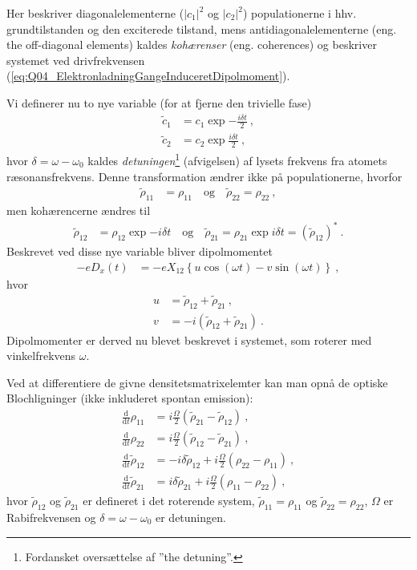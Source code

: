Her beskriver diagonalelementerne ($|c_1|^2$ og $|c_2|^2$) populationerne i hhv. grundtilstanden og den exciterede tilstand, mens antidiagonalelementerne (eng. the off-diagonal elements) kaldes \emph{kohærenser} (eng. coherences) og beskriver systemet ved drivfrekvensen (\cref{eq:Q04_ElektronladningGangeInduceretDipolmoment}).

Vi definerer nu to nye variable (for at fjerne den trivielle fase)
\begin{align}
    \widetilde{c}_1 &= c_1\exp{-\frac{i\delta t}{2}} \: , \\
    \widetilde{c}_2 &= c_2\exp{\frac{i\delta t}{2}} \: ,
\end{align}
hvor $\delta = \omega - \omega_0$ kaldes \emph{detuningen}\footnote{Fordansket oversættelse af ''the detuning''.} (afvigelsen) af lysets frekvens fra atomets ræsonansfrekvens. Denne transformation ændrer ikke på populationerne, hvorfor
\begin{align}
    \widetilde{\rho}_{11} &= \rho_{11} \quad \text{og} \quad \widetilde{\rho}_22 = \rho_{22} \: ,
\end{align}
men kohærencerne ændres til
\begin{align}
    \widetilde{\rho}_{12} &= \rho_{12}\exp{-i\delta t} \quad \text{og} \quad \widetilde{\rho}_{21} = \rho_{21}\exp{i\delta t} = (\widetilde{\rho}_{12})^* \: .
\end{align}
Beskrevet ved disse nye variable bliver dipolmomentet
\begin{align}
    -eD_x(t) &= -eX_{12}\left\{u\cos(\omega t) - v\sin(\omega t)\right\} \: ,
\end{align}
hvor
\begin{align}
    u &= \widetilde{\rho}_{12} + \widetilde{\rho}_{21} \: , \\
    v &= -i\left(\widetilde{\rho}_{12} + \widetilde{\rho}_{21}\right) \: .
\end{align}
Dipolmomenter er derved nu blevet beskrevet i systemet, som roterer med vinkelfrekvens $\omega$.

Ved at differentiere de givne densitetsmatrixelemter kan man opnå de optiske Blochligninger (ikke inkluderet spontan emission):
\begin{align} \label{eq:Q04_OpticalBlochEquations}
    \frac{\text{d}}{\text{d}t}\rho_{11} &= i \frac{\Omega}{2}\left(\widetilde{\rho}_{21} - \widetilde{\rho}_{12}\right) \: , \\
    \frac{\text{d}}{\text{d}t}\rho_{22} &= i \frac{\Omega}{2}\left(\widetilde{\rho}_{12} - \widetilde{\rho}_{21}\right) \: , \\
    \frac{\text{d}}{\text{d}t}\widetilde{\rho}_{12} &= -i\delta\widetilde{\rho}_{12} + i \frac{\Omega}{2}\left(\rho_{22} - \rho_{11}\right) \: , \\
    \frac{\text{d}}{\text{d}t}\widetilde{\rho}_{21} &= i\delta\widetilde{\rho}_{21} + i \frac{\Omega}{2}\left(\rho_{11} - \rho_{22}\right) \: ,
\end{align}
hvor $\widetilde{\rho}_{12}$ og $\widetilde{\rho}_{21}$ er defineret i det roterende system, $\widetilde{\rho}_{11} = \rho_{11}$ og $\widetilde{\rho}_{22} = \rho_{22}$, $\Omega$ er Rabifrekvensen og $\delta = \omega - \omega_0$ er detuningen.


